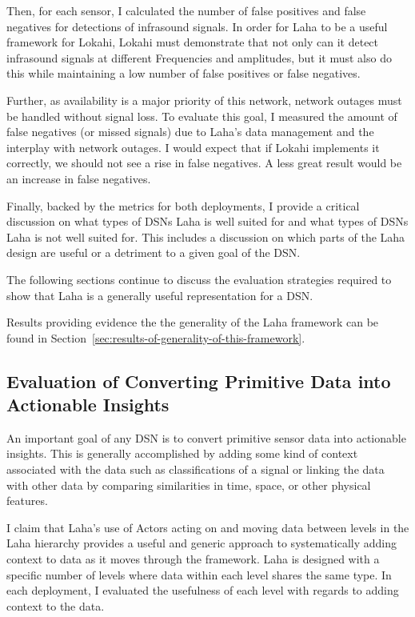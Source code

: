 Then, for each sensor, I calculated the number of false positives and false negatives for detections of infrasound signals. In order for Laha to be a useful framework for Lokahi, Lokahi must demonstrate that not only can it detect infrasound signals at different Frequencies and amplitudes, but it must also do this while maintaining a low number of false positives or false negatives.

Further, as availability is a major priority of this network, network outages must be handled without signal loss. To evaluate this goal, I measured the amount of false negatives (or missed signals) due to Laha's data management and the interplay with network outages. I would expect that if Lokahi implements it correctly, we should not see a rise in false negatives. A less great result would be an increase in false negatives.

Finally, backed by the metrics for both deployments, I provide a critical discussion on what types of DSNs Laha is well suited for and what types of DSNs Laha is not well suited for. This includes a discussion on which parts of the Laha design are useful or a detriment to a given goal of the DSN\@.

The following sections continue to discuss the evaluation strategies required to show that Laha is a generally useful representation for a DSN\@.

Results providing evidence the the generality of the Laha framework can be found in Section~\ref{sec:results-of-generality-of-this-framework}.

\subsection{Evaluation of Converting Primitive Data into Actionable Insights}\label{subsec:evaluation-of-converting-primitive-data-into-actionable-insights}
An important goal of any DSN is to convert primitive sensor data into actionable insights. This is generally accomplished by adding some kind of context associated with the data such as classifications of a signal or linking the data with other data by comparing similarities in time, space, or other physical features.

I claim that Laha's use of Actors acting on and moving data between levels in the Laha hierarchy provides a useful and generic approach to systematically adding context to data as it moves through the framework. Laha is designed with a specific number of levels where data within each level shares the same type. In each deployment, I evaluated the usefulness of each level with regards to adding context to the data.

